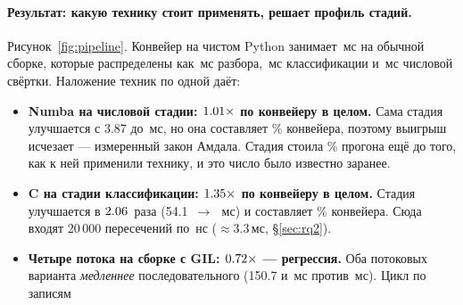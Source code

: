 \paragraph{Результат: какую технику стоит применять, решает профиль стадий.}
Рисунок~\ref{fig:pipeline}. Конвейер на чистом Python занимает \,мс на
обычной сборке, которые распределены как \,мс разбора, \,мс классификации и \,мс
числовой свёртки. Наложение техник по одной даёт:

\begin{itemize}[leftmargin=1.4em,itemsep=1pt]
  \item \textbf{Numba на числовой стадии: $\meas{ratio:b7_pipeline-gil:end_to_end/gil/v0_pure|b7_pipeline-gil:end_to_end/gil/v1_numba}{1.01}\times$ по конвейеру в целом.} Сама стадия улучшается с 3.87
        до \,мс, но она составляет \% конвейера, поэтому выигрыш исчезает --- измеренный
        закон Амдала. Стадия стоила \% прогона ещё до того, как к ней применили технику, и
        это число было известно заранее.
  \item \textbf{C на стадии классификации: $\meas{ratio:b7_pipeline-gil:end_to_end/gil/v0_pure|b7_pipeline-gil:end_to_end/gil/v2_numba_native}{1.35}\times$ по конвейеру в целом.} Стадия улучшается в
        $\meas{ratio:b7_pipeline-gil:stage_validate/gil/v0_pure|b7_pipeline-gil:stage_validate/gil/v2_native}{2.06}$~раза (54.1~$\to$~\,мс) и составляет \% конвейера. Сюда входят
        20\,000 пересечений  по \,нс ($\approx 3.3$\,мс, \S\ref{sec:rq2}).
  \item \textbf{Четыре потока на сборке с GIL: $\meas{ratio:b7_pipeline-gil:end_to_end/gil/v0_pure|b7_pipeline-gil:end_to_end/gil/v3_native_threads}{0.72}\times$ --- регрессия.} Оба потоковых варианта
        \emph{медленнее} последовательного (150.7 и \,мс против \,мс). Цикл по записям

\end{itemize}
